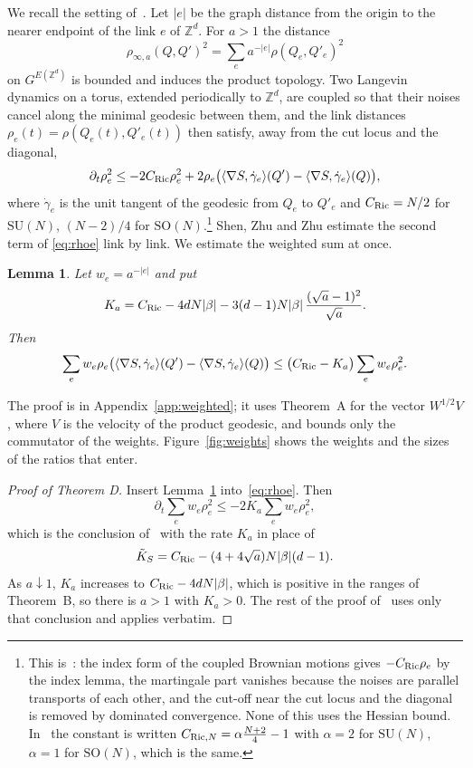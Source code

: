 \documentclass[aps,prd,twocolumn,superscriptaddress,nofootinbib,longbibliography,floatfix,amsmath,amssymb,10pt]{revtex4-2}
\newtheorem{lemma}[theorem]{Lemma}
\theoremstyle{definition}
\theoremstyle{remark}
\newcommand{\Z}{\mathbb{Z}}
\newcommand{\SU}{\mathrm{SU}}
\newcommand{\SO}{\mathrm{SO}}
\newcommand{\ip}[2]{\langle #1,#2\rangle}
\begin{document}
We recall the setting of~\cite[Sec.~5]{SZZ23}. Let $|e|$ be the graph distance
from the origin to the nearer endpoint of the link $e$ of $\Z^d$. For $a>1$
the distance
\begin{equation}\label{eq:rhoa}
\rho_{\infty,a}(Q,Q')^2=\sum_ea^{-|e|}\rho(Q_e,Q'_e)^2
\end{equation}
on $G^{E(\Z^d)}$ is bounded and induces the product topology. Two Langevin
dynamics on a torus, extended periodically to $\Z^d$, are coupled so that
their noises cancel along the minimal geodesic between them, and the link
distances $\rho_e(t)=\rho(Q_e(t),Q'_e(t))$ then satisfy, away from the cut
locus and the diagonal,
\begin{equation}\label{eq:rhoe}
\partial_t\rho_e^2\le-2C_{\rm Ric}\rho_e^2+2\rho_e\bigl(\ip{\nabla
S}{\dot\gamma_e}(Q')-\ip{\nabla S}{\dot\gamma_e}(Q)\bigr),
\end{equation}
where $\dot\gamma_e$ is the unit tangent of the geodesic from $Q_e$ to
$Q'_e$ and $C_{\rm Ric}=N/2$ for $\SU(N)$, $(N-2)/4$ for
$\SO(N)$.\footnote{This is~\cite[Eqs.~(5.5), (5.6), (5.10), (5.11)]{SZZ23}:
the index form of the coupled Brownian motions gives $-C_{\rm Ric}\rho_e$
by the index lemma, the martingale part vanishes because the noises are
parallel transports of each other, and the cut-off near the cut locus and
the diagonal is removed by dominated convergence. None of this uses the
Hessian bound. In~\cite{SZZ23} the constant is written $C_{{\rm
Ric},N}=\alpha\frac{N+2}4-1$ with $\alpha=2$ for $\SU(N)$, $\alpha=1$ for
$\SO(N)$, which is the same.} Shen, Zhu and Zhu estimate the second term of
\eqref{eq:rhoe} link by link. We estimate the weighted sum at once.

\begin{lemma}\label{lem:weighted}
Let $w_e=a^{-|e|}$ and put
\[
K_a=C_{\rm Ric}-4dN|\beta|-3(d-1)N|\beta|\,\frac{(\sqrt a-1)^2}{\sqrt a}.
\]
Then
\[
\sum_ew_e\rho_e\bigl(\ip{\nabla S}{\dot\gamma_e}(Q')-\ip{\nabla
S}{\dot\gamma_e}(Q)\bigr)\le\bigl(C_{\rm Ric}-K_a\bigr)\sum_ew_e\rho_e^2 .
\]
\end{lemma}

The proof is in Appendix~\ref{app:weighted}; it uses Theorem~A for the
vector $W^{1/2}V$, where $V$ is the velocity of the product geodesic, and
bounds only the commutator of the weights. Figure~\ref{fig:weights} shows the
weights and the sizes of the ratios that enter.

\begin{proof}[Proof of Theorem D]
Insert Lemma~\ref{lem:weighted} into~\eqref{eq:rhoe}. Then
\[
\partial_t\sum_ew_e\rho_e^2\le-2K_a\sum_ew_e\rho_e^2,
\]
which is the conclusion of~\cite[Lemma~5.1]{SZZ23} with the rate $K_a$ in
place of
\[
\tilde K_S=C_{\rm Ric}-(4+4\sqrt a)N|\beta|(d-1).
\] As $a\downarrow1$, $K_a$
increases to $C_{\rm Ric}-4dN|\beta|$, which is positive in the ranges of
Theorem~B, so there is $a>1$ with $K_a>0$. The rest of the proof
of~\cite[Thm.~1.2]{SZZ23} uses only that conclusion and applies verbatim.
\end{proof}
\end{document}
